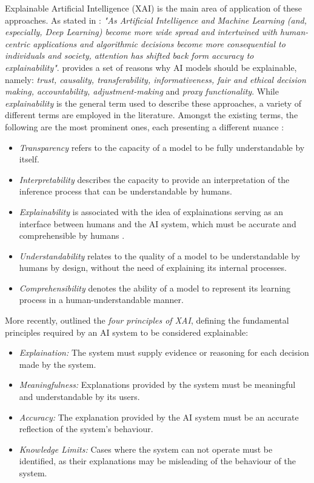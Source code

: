 Explainable Artificial Intelligence (XAI) is the main area of application of these approaches. As stated in \cite{angelov_explainable_2021}: \textit{"As Artificial Intelligence and Machine Learning (and, especially, Deep Learning) become more wide spread and intertwined with human-centric applications and algorithmic decisions become more consequential to individuals and society, attention has shifted back form accuracy to explainability"}. \cite{burkart_survey_2021} provides a set of reasons why AI models should be explainable, namely: \textit{trust, causality, transferability, informativeness, fair and ethical decision making, accountability, adjustment-making} and \textit{proxy functionality}. 
While \textit{explainability} is the general term used to describe these approaches, a variety of different terms are employed in the literature. Amongst the existing terms, the following are the most prominent ones, each presenting a different nuance \citep{barredo_arrieta_explainable_2020,adadi_explainability_2018,gilpin_explainability_2018}:
\begin{itemize}
    \item \textit{Transparency} refers to the capacity of a model to be fully understandable by itself.
    \item \textit{Interpretability} describes the capacity to provide an interpretation of the inference process that can be understandable by humans. 
    \item \textit{Explainability} is associated with the idea of explainations serving as an interface between humans and the AI system, which must be accurate and comprehensible by humans \citep{guidotti_explainability_2018}.
    \item \textit{Understandability} relates to the quality of a model to be understandable by humans by design, without the need of explaining its internal processes.
    \item \textit{Comprehensibility} denotes the ability of a model to represent its learning process in a human-understandable manner.
\end{itemize}

More recently, \cite{phillips_explainability_2021} outlined the \textit{four principles of XAI}, defining the fundamental principles required by an AI system to be considered explainable:

\begin{itemize}
    \item \textit{Explaination:} The system must supply evidence or reasoning for each decision made by the system.
    \item \textit{Meaningfulness:} Explanations provided by the system must be meaningful and understandable by its users.
    \item \textit{Accuracy:} The explanation provided by the AI system must be an accurate reflection of the system's behaviour.
    \item \textit{Knowledge Limits:} Cases where the system can not operate must be identified, as their explanations may be misleading of the behaviour of the system.
    
\end{itemize}

